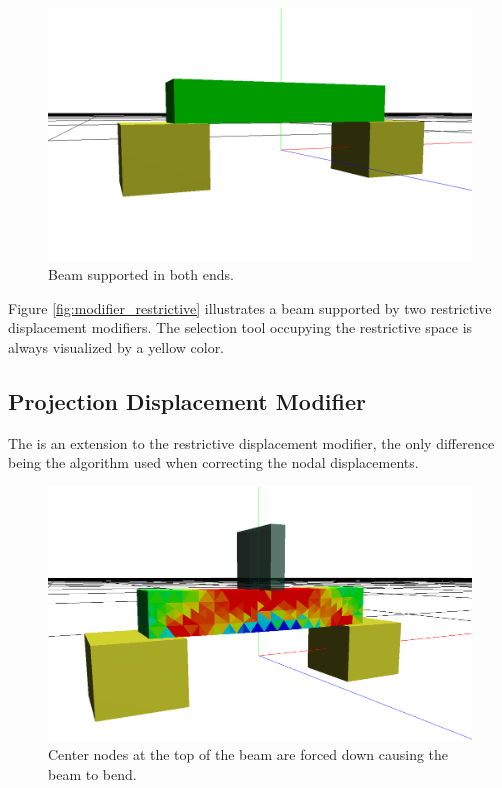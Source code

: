 \begin{figure}
  \centering
  \includegraphics[width=12cm]{./images/helper_tools_modifiers_restrictive.png}
\caption{Beam supported in both ends.}
\label{fig:modifier_restrictive}
\end{figure}

Figure \vref{fig:modifier_restrictive} illustrates a beam supported by
two restrictive displacement modifiers. The selection tool occupying
the restrictive space is always visualized by a yellow color.  

\subsection{Projection Displacement Modifier}
The  is an extension to the
restrictive displacement modifier, the only difference being 
the algorithm used when correcting the nodal displacements. 

\begin{figure}
  \centering
  \includegraphics[width=12cm]{./images/helper_tools_modifiers_projection.png}
\caption{Center nodes at the top of the beam are forced down
  causing the beam to bend.}
\label{fig:modifier_projection}
\end{figure}

